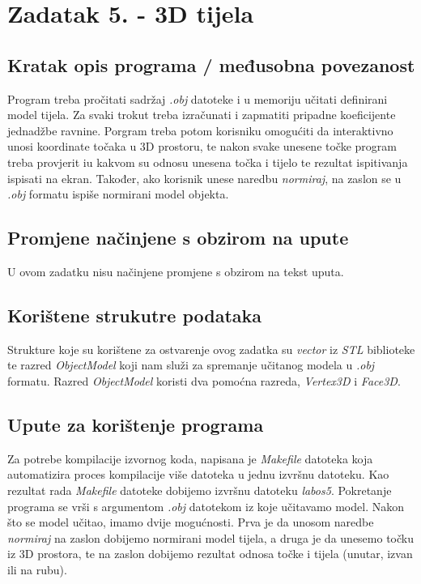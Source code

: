 \documentclass{report}
\begin{document}
\section{Zadatak 5. - 3D tijela}
\subsection{Kratak opis programa / međusobna povezanost}
Program treba pročitati sadržaj \textit{.obj} datoteke i u memoriju učitati definirani model tijela. Za svaki trokut treba izračunati i zapmatiti pripadne koeficijente jednadžbe ravnine. Porgram treba potom korisniku omogućiti da interaktivno unosi koordinate točaka u 3D prostoru, te nakon svake unesene točke program treba provjerit iu kakvom su odnosu unesena točka i tijelo te rezultat ispitivanja ispisati na ekran. Također, ako korisnik unese naredbu \textit{normiraj}, na zaslon se u \textit{.obj} formatu ispiše normirani model objekta. 

\subsection{Promjene načinjene s obzirom na upute}
U ovom zadatku nisu načinjene promjene s obzirom na tekst uputa.

\subsection{Korištene strukutre podataka}
Strukture koje su korištene za ostvarenje ovog zadatka su \textit{vector} iz \textit{STL} biblioteke te razred \textit{ObjectModel} koji nam služi za spremanje učitanog modela u \textit{.obj} formatu. Razred \textit{ObjectModel} koristi dva pomoćna razreda, \textit{Vertex3D} i \textit{Face3D}.

\subsection{Upute za korištenje programa}
Za potrebe kompilacije izvornog koda, napisana je \textit{Makefile} datoteka koja automatizira proces kompilacije više datoteka u jednu izvršnu datoteku. Kao rezultat rada \textit{Makefile} datoteke dobijemo izvršnu datoteku \textit{labos5}. Pokretanje programa se vrši s argumentom \textit{.obj} datotekom iz koje učitavamo model. Nakon što se model učitao, imamo dvije mogućnosti. Prva je da unosom naredbe \textit{normiraj} na zaslon dobijemo normirani model tijela, a druga je da unesemo točku iz 3D prostora, te na zaslon dobijemo rezultat odnosa točke i tijela (unutar, izvan ili na rubu).
\end{document}
